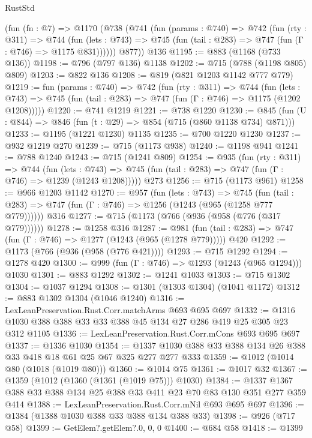 \begin{lexlean}{RustStd}
\begin{coremodule}
    (fun (fn : @7) =>
    @1170
      (@738
        (@741
          (fun (params : @740) =>
          @742
            (fun (rty : @311) =>
            @744
              (fun (lets : @743) =>
              @745 (fun (tail : @283) => @747 (fun (Γ : @746) => @1175 @831))))))
        @877))
    @136
@1195 := @883 (@1168 (@733 @136))
@1198 := @796 (@797 @136) @1138
@1202 := @715 (@788 (@1198 @805) @809)
@1203 := @822 @136
@1208 := @819 (@821 @1203 @1142 @777 @779)
@1219 := fun (params : @740) =>
  @742
    (fun (rty : @311) =>
    @744
      (fun (lets : @743) =>
      @745 (fun (tail : @283) => @747 (fun (Γ : @746) => @1175 (@1202 @1208)))))
@1220 := @741 @1219
@1221 := @738 @1220
@1230 := @845 (fun (U : @844) => @846 (fun (t : @29) => @854 (@715 (@860 @1138 @734) @871)))
@1233 := @1195 (@1221 @1230) @1135
@1235 := @700 @1220 @1230
@1237 := @932 @1219 @270
@1239 := @715 (@1173 @938)
@1240 := @1198 @941
@1241 := @788 @1240
@1243 := @715 (@1241 @809)
@1254 := @935
    (fun (rty : @311) =>
    @744
      (fun (lets : @743) =>
      @745 (fun (tail : @283) => @747 (fun (Γ : @746) => @1239 (@1243 @1208)))))
    @273
@1256 := @715 (@1173 @961)
@1258 := @966 @1203 @1142
@1270 := @957
    (fun (lets : @743) =>
    @745 (fun (tail : @283) => @747 (fun (Γ : @746) => @1256 (@1243 (@965 (@1258 @777 @779))))))
    @316
@1277 := @715 (@1173 (@766 (@936 (@958 (@776 (@317 @779))))))
@1278 := @1258 @316
@1287 := @981 (fun (tail : @283) => @747 (fun (Γ : @746) => @1277 (@1243 (@965 (@1278 @779))))) @420
@1292 := @1173 (@766 (@936 (@958 (@776 @421))))
@1293 := @715 @1292
@1294 := @1278 @420
@1300 := @999 (fun (Γ : @746) => @1293 (@1243 (@965 @1294))) @1030
@1301 := @883 @1292
@1302 := @1241 @1033
@1303 := @715 @1302
@1304 := @1037 @1294
@1308 := @1301 (@1303 @1304) (@1041 @1172)
@1312 := @883 @1302 @1304 (@1046 @1240)
@1316 := LexLeanPreservation.Rust.Corr.matchArms @693 @695 @697
@1332 := @1316 @1030 @388 @388 @33 @33 @388 @45 @134 @27 @286 @419 @25 @305 @23 @312 @1105
@1336 := LexLeanPreservation.Rust.Corr.mCons @693 @695 @697
@1337 := @1336 @1030
@1354 := @1337 @1030 @388 @33 @388 @134 @26 @388 @33 @418 @18 @61 @25 @67 @325 @277 @277 @333
@1359 := @1012 (@1014 @80 (@1018 (@1019 @80)))
@1360 := @1014 @75
@1361 := @1017 @32
@1367 := @1359 (@1012 (@1360 (@1361 (@1019 @75))) @1030)
@1384 := @1337 @1367 @388 @33 @388 @134 @25 @388 @33 @411 @23 @70 @83 @130 @351 @277 @359 @414
@1388 := LexLeanPreservation.Rust.Corr.mNil @693 @695 @697
@1396 := @1384 (@1388 @1030 @388 @33 @388 @134 @388 @33)
@1398 := @926 (@717 @58)
@1399 := GetElem?.getElem?.{0, 0, 0}
@1400 := @684 @58
@1418 := @1399

\end{coremodule}
\end{lexlean}
